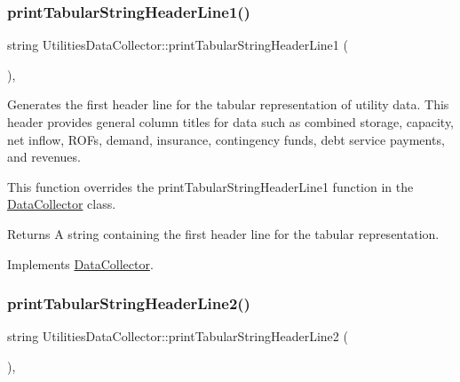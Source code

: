 \mbox{\label{classUtilitiesDataCollector_a796aa9d7637d8ed04dbd949ca2a34088}} 
\subsubsection{\texorpdfstring{print\+Tabular\+String\+Header\+Line1()}{printTabularStringHeaderLine1()}}
{\footnotesize\ttfamily string Utilities\+Data\+Collector\+::print\+Tabular\+String\+Header\+Line1 (\begin{DoxyParamCaption}{ }\end{DoxyParamCaption})\hspace{0.3cm}{\ttfamily [override]}, {\ttfamily [virtual]}}



Generates the first header line for the tabular representation of utility data. This header provides general column titles for data such as combined storage, capacity, net inflow, R\+O\+Fs, demand, insurance, contingency funds, debt service payments, and revenues. 

This function overrides the {\ttfamily print\+Tabular\+String\+Header\+Line1} function in the {\ttfamily \mbox{\hyperlink{classDataCollector}{Data\+Collector}}} class.

\begin{DoxyReturn}{Returns}
A string containing the first header line for the tabular representation. 
\end{DoxyReturn}


Implements \mbox{\hyperlink{classDataCollector_a91619cfa9e9b8cefd2f7c20d5718b41e}{Data\+Collector}}.

\mbox{\label{classUtilitiesDataCollector_ae502a096e8f4fdfdfd481ab2093f9771}} 
\subsubsection{\texorpdfstring{print\+Tabular\+String\+Header\+Line2()}{printTabularStringHeaderLine2()}}
{\footnotesize\ttfamily string Utilities\+Data\+Collector\+::print\+Tabular\+String\+Header\+Line2 (\begin{DoxyParamCaption}{ }\end{DoxyParamCaption})\hspace{0.3cm}{\ttfamily [override]}, {\ttfamily [virtual]}}



